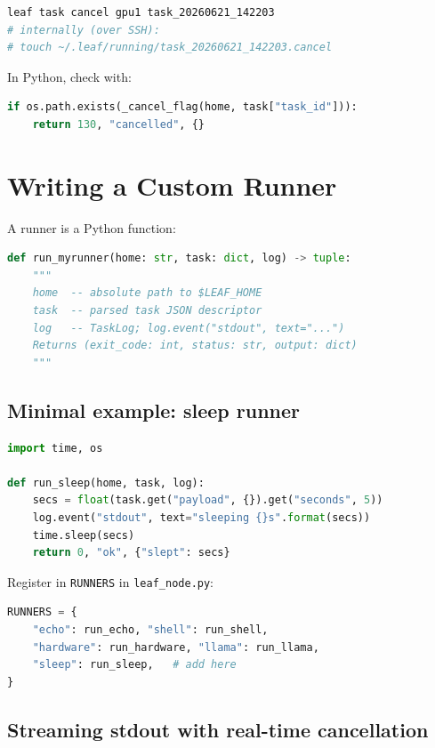 \documentclass[11pt,a4paper]{article}
\begin{document}
\begin{lstlisting}[language=bash]
leaf task cancel gpu1 task_20260621_142203
# internally (over SSH):
# touch ~/.leaf/running/task_20260621_142203.cancel
\end{lstlisting}

In Python, check with:
\begin{lstlisting}[language=python]
if os.path.exists(_cancel_flag(home, task["task_id"])):
	return 130, "cancelled", {}
\end{lstlisting}

\section{Writing a Custom Runner}

A runner is a Python function:

\begin{lstlisting}[language=python]
def run_myrunner(home: str, task: dict, log) -> tuple:
	"""
	home  -- absolute path to $LEAF_HOME
	task  -- parsed task JSON descriptor
	log   -- TaskLog; log.event("stdout", text="...")
	Returns (exit_code: int, status: str, output: dict)
	"""
\end{lstlisting}

\subsection{Minimal example: sleep runner}

\begin{lstlisting}[language=python]
import time, os

def run_sleep(home, task, log):
	secs = float(task.get("payload", {}).get("seconds", 5))
	log.event("stdout", text="sleeping {}s".format(secs))
	time.sleep(secs)
	return 0, "ok", {"slept": secs}
\end{lstlisting}

Register in \texttt{RUNNERS} in \texttt{leaf\_node.py}:
\begin{lstlisting}[language=python]
RUNNERS = {
	"echo": run_echo, "shell": run_shell,
	"hardware": run_hardware, "llama": run_llama,
	"sleep": run_sleep,   # add here
}
\end{lstlisting}

\subsection{Streaming stdout with real-time cancellation}
\end{document}
